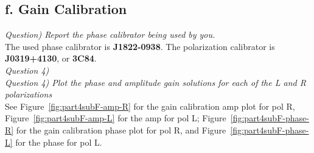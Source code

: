 \documentclass[12pt, a4paper]{article}
\begin{document}
\subsection{f. Gain Calibration}
\noindent \textit{Question) Report the phase calibrator being used by you.} \\
The used phase calibrator is \textbf{J1822-0938}. The polarization calibrator is \textbf{J0319+4130}, or \textbf{3C84}.\\


% 
% 
% 
\noindent \textit{Question 4) } \\
% 
% 
% 
% 
% 
\newpage \noindent \textit{Question 4) Plot the phase and amplitude gain solutions for each of the L and R polarizations} \\
See Figure~\ref{fig:part4subF-amp-R} for the gain calibration amp plot for pol R, Figure~\ref{fig:part4subF-amp-L} for the amp for pol L; Figure~\ref{fig:part4subF-phase-R} for the gain calibration phase plot for pol R, and Figure~\ref{fig:part4subF-phase-L} for the phase for pol L.
\end{document}
